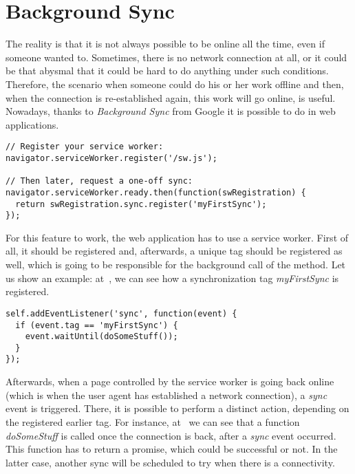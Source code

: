 \section{Background Sync}

The reality is that it is not always possible to be online all the time, even if someone wanted to. Sometimes, there is no network connection at all, or it could be that abysmal that it could be hard to do anything under such conditions. Therefore, the scenario when someone could do his or her work offline and then, when the connection is re-established again, this work will go online, is useful. Nowadays, thanks to \textit{Background Sync}\cite{38} from Google it is possible to do in web applications. 

\begin{lstlisting}[caption={An example code, which demonstrates how to register a sync (\textit{myFirstSync} here) event for the service worker\cite{38}.}, label={lst:tech8}]
// Register your service worker:
navigator.serviceWorker.register('/sw.js');

// Then later, request a one-off sync:
navigator.serviceWorker.ready.then(function(swRegistration) {
  return swRegistration.sync.register('myFirstSync');
});
\end{lstlisting} 

For this feature to work, the web application has to use a service worker. First of all, it should be registered and, afterwards, a unique tag should be registered as well, which is going to be responsible for the background call of the method. Let us show an example: at~, we can see how a synchronization tag \textit{myFirstSync} is registered.

\begin{lstlisting}[caption={An example code, which demonstates that a function \textit{doSomeStuff} called, when the \textit{sync} event happened\cite{38}.}, label={lst:tech9}]
self.addEventListener('sync', function(event) {
  if (event.tag == 'myFirstSync') {
    event.waitUntil(doSomeStuff());
  }
});
\end{lstlisting} 

Afterwards, when a page controlled by the service worker is going back online (which is when the user agent has established a network connection\cite{44}), a \textit{sync} event is triggered. There, it is possible to perform a distinct action, depending on the registered earlier tag. For instance, at~ we can see that a function \textit{doSomeStuff} is called once the connection is back, after a \textit{sync} event occurred. This function has to return a promise, which could be successful or not. In the latter case, another sync will be scheduled to try when there is a connectivity\cite{38}. 

